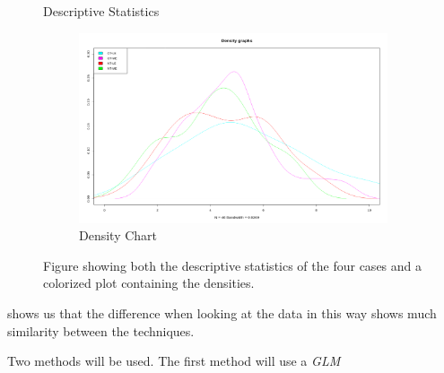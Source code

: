\documentclass{tufte-handout}
\begin{document}
\begin{figure}[h]
    \begin{subtable}[t]{0.52\textwidth}
        \caption{Descriptive Statistics}
    \end{subtable}
    \begin{subfigure}[t]{0.43\textwidth}
        \caption{Density Chart}
        \centering
        \includegraphics[width=\textwidth]{density-chart.png}
    \end{subfigure}
    \caption{Figure showing both the descriptive statistics of the four cases and a colorized plot containing the densities.}
    \label{fig:ds}
\end{figure}

 shows us that the difference when looking at the data in this way shows much similarity between the techniques.

Two methods will be used.
The first method will use a \textit{GLM}
\end{document}
